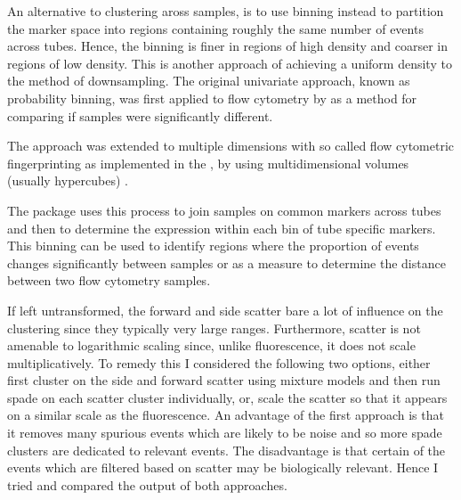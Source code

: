 An alternative to clustering aross samples, is to use binning instead to partition the marker space into regions containing roughly the same number of
events across tubes. Hence, the binning is finer in regions of high density and coarser in regions of low density.
This is another approach of achieving a uniform density to the method of downsampling.
The original univariate approach, known as probability binning, was first applied to flow cytometry by \citet{Roederer:2001tz}
as a method for comparing if samples were significantly different.

The approach was extended to multiple dimensions with
so called flow cytometric fingerprinting as implemented in
the ,
by using multidimensional volumes (usually hypercubes) \citep{Rogers:2008ij,Rogers:2009ff}.





The  package uses this process to join samples on common markers across tubes and then to determine the expression within each bin of tube specific markers.
This binning can be used to identify regions where the proportion of events changes significantly between samples
or as a measure to determine the distance between two flow cytometry samples.

If left untransformed, the forward and side scatter bare a lot of influence on the clustering since they typically very large ranges.
Furthermore, scatter is not amenable to logarithmic scaling since, unlike fluorescence, it does not scale multiplicatively.
To remedy this I considered the following two options, either first cluster on the side and forward scatter using mixture models
and then run spade on each scatter cluster individually,
or, scale the scatter so that it appears on a similar scale as the fluorescence.
An advantage of the first approach is that it removes many spurious events which are likely to be noise and so more spade clusters are
dedicated to relevant events.
The disadvantage is that certain of the events which are filtered based on scatter may be biologically relevant.
Hence I tried and compared the output of both approaches.

